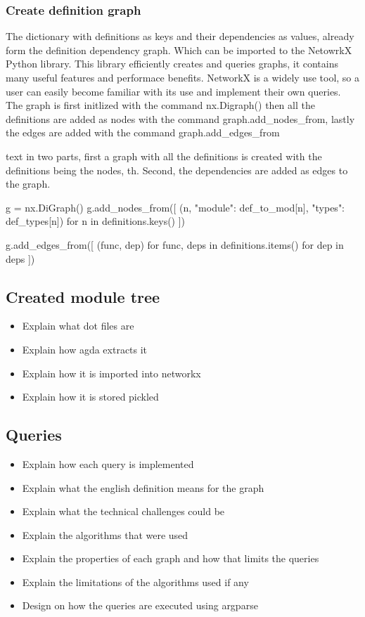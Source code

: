 \subsubsection{Create definition graph}

The dictionary with definitions as keys and their dependencies as values,
already form the definition dependency graph. Which can be imported to the
NetowrkX Python library. This library efficiently creates and queries graphs,
it contains many useful features and performace benefits. NetworkX is a widely
use tool, so a user can easily become familiar with its use and implement their
own queries. The graph is first initlized with the command
\textsf{nx.Digraph()} then all the definitions are added as nodes with the
command \textsf{graph.add\_nodes\_from}, lastly the edges are added with the command \textsf{graph.add\_edges\_from}

\textsf{text} in two parts, first a graph with all the definitions is created
with the definitions being the nodes, th. Second, the dependencies are added as
edges to the graph.

    g = nx.DiGraph()
    g.add_nodes_from([
        (n, {"module": def_to_mod[n], "types": def_types[n]})
        for n in definitions.keys()
    ])

    g.add_edges_from([
        (func, dep)
        for func, deps in definitions.items()
        for dep in deps
    ])

\subsection{Created module tree}

\begin{itemize}
\item Explain what dot files are
\item Explain how agda extracts it
\item Explain how it is imported into networkx
\item Explain how it is stored pickled
\end{itemize}

\subsection{Queries}

\begin{itemize}
\item Explain how each query is implemented 
\item Explain what the english definition means for the graph 
\item Explain what the technical challenges could be 
\item Explain the algorithms that were used 
\item Explain the properties of each graph and how that limits the queries 
\item Explain the limitations of the algorithms used if any 
\item Design on how the queries are executed using argparse
\end{itemize}

